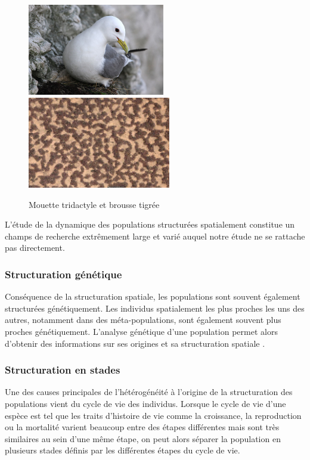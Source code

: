 \begin{figure}[H]
\centering
\includegraphics[height=4cm]{1_CorpsDeThese/EA/Fig/mouette}
\includegraphics[height=4cm]{1_CorpsDeThese/EA/Fig/brousse}
\caption[Mouette tridactyle et brousse tigrée]{Mouette tridactyle et brousse
tigrée}\label{fig:mouette}
\end{figure}

L'étude de la dynamique des populations structurées spatialement constitue un
champs de recherche extrêmement large et varié auquel notre étude ne se rattache
pas directement. 

\subsubsection{Structuration génétique}

Conséquence de la structuration spatiale, les populations sont souvent également
structurées génétiquement. Les individus spatialement les plus proches les uns
des autres, notamment dans des méta-populations, sont également souvent plus
proches génétiquement. L'analyse génétique d'une population permet alors d'obtenir des
informations sur ses origines et sa structuration spatiale
\autocites{repaci2006a,booth2009a,jorde2007a}.

\subsubsection{Structuration en stades}

Une des causes principales de l'hétérogénéité à l'origine de la
structuration des populations vient du cycle de vie des individus. Lorsque le
cycle de vie d'une espèce est tel que les traits d'histoire de vie comme la
croissance, la reproduction ou la mortalité varient beaucoup entre des étapes
différentes mais sont très similaires au sein d'une même étape, on peut alors
séparer la population en plusieurs stades définis par les différentes étapes du
cycle de vie.

